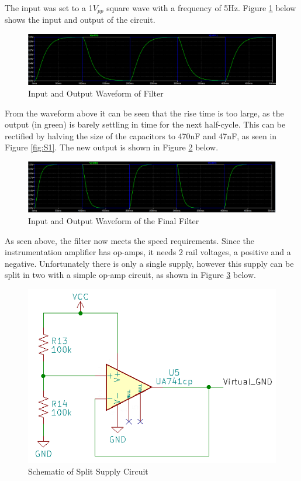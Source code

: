 \documentclass[class=report,11pt,crop=false]{standalone}
\begin{document}
	The input was set to a 1$V_{pp}$ square wave with a frequency of 5Hz. Figure \ref{fig:S3} below shows the input and output of the circuit.
	
	\begin{figure}[h!]
		\centering
		\includegraphics[width=0.9\linewidth]{Figures/Filter Waveform.png}
		\caption{Input and Output Waveform of Filter}
		\label{fig:S3}
	\end{figure}
	
	From the waveform above it can be seen that the rise time is too large, as the output (in green) is barely settling in time for the next half-cycle. This can be rectified by halving the size of the capacitors to 470nF and 47nF, as seen in Figure \ref{fig:S1}. The new output is shown in Figure \ref{fig:S4} below.
	
	\begin{figure}[h!]
		\centering
		\includegraphics[width=0.9\linewidth]{Figures/Filter Waveform2.png}
		\caption{Input and Output Waveform of the Final Filter}
		\label{fig:S4}
	\end{figure}
	As seen above, the filter now meets the speed requirements.
	Since the instrumentation amplifier has op-amps, it needs 2 rail voltages, a positive and a negative. Unfortunately there is only a single supply, however this supply can be split in two with a simple op-amp circuit, as shown in Figure \ref{fig:S5} below.
	\begin{figure}[h!]
		\centering
		\includegraphics[width=0.5\linewidth]{Figures/Split Supply.png}
		\caption{Schematic of Split Supply Circuit}
		\label{fig:S5}
	\end{figure}
	
\end{document}
